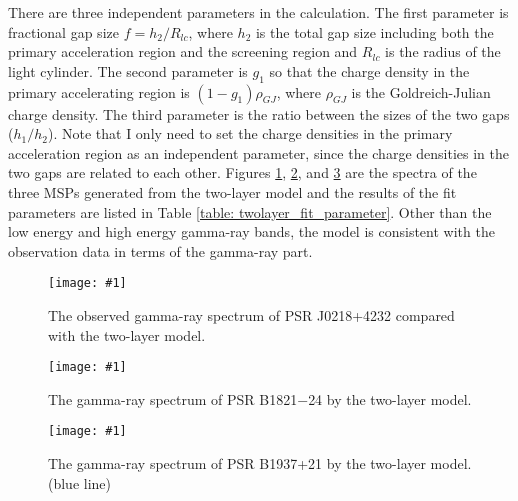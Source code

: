 \documentclass[a4paper, 12pt]{report}
\newcommand{\singleFig}[3]{
  \begin{figure}[!htp]
    \centering
    \texttt{[image: \#1]}
    \caption{#3}
    \label{fig: #1}
  \end{figure}
}
\newcommand{\mayChange}[1]{
  $<$\colorbox{red}{\textbf{mayChange}}$>$#1$<$\colorbox{red}{\textbf{/mayChange}}$>$
}
\begin{document}
    There are three independent parameters in the calculation. 
    The first parameter is fractional gap size $f=h_{2}/R_{lc}$, where $h_{2}$ is the 
    total gap size including both the primary acceleration region and the screening region 
    and $R_{lc}$ is the radius of the light cylinder. The second parameter is $g_{1}$ so that
    the charge density in the primary accelerating region is $\left(1-g_{1}\right) \rho_{GJ}$, 
    where $\rho_{GJ}$ is the Goldreich-Julian charge density. The third parameter is the ratio 
    between the sizes of the two gaps ($h_{1}/h_{2}$). Note that I only need to set the charge 
    densities in the primary acceleration region as an independent parameter, since the charge 
    densities in the two gaps are related to each other. Figures 
    \ref{fig: j0218_twolayer_cur.png}, \ref{fig: b1821_twolayer_cur.png}, and 
    \ref{fig: j1939_twolayer_cur.png} are the spectra of the three MSPs generated from 
    the two-layer model and the results of the 
    fit parameters are listed in Table \ref{table: twolayer_fit_parameter}. Other than the 
    low energy and high energy gamma-ray bands, the model is consistent with the observation 
    data in terms of the gamma-ray part. 


    \singleFig{j0218_twolayer_cur.png}{0.37}{The observed gamma-ray spectrum of PSR 
      J0218+4232 compared with the two-layer model.}
    \singleFig{b1821_twolayer_cur.png}{0.37}{The gamma-ray spectrum of PSR B1821$-$24 by 
      the two-layer model.}
    \singleFig{j1939_twolayer_cur.png}{0.34}{The gamma-ray spectrum of PSR B1937+21 by 
      the two-layer model. (blue line)}

        
\end{document}
